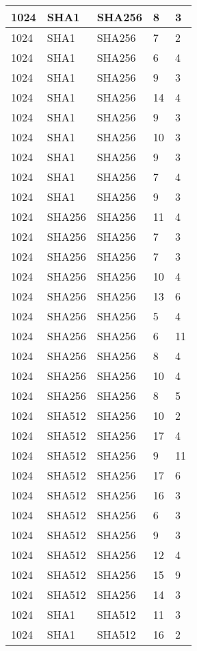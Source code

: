 \begin{tabular}{| l | l | l | l | l |}
1024 & SHA1 & SHA256 & 8 & 3 \\ \hline 
1024 & SHA1 & SHA256 & 7 & 2 \\ \hline 
1024 & SHA1 & SHA256 & 6 & 4 \\ \hline 
1024 & SHA1 & SHA256 & 9 & 3 \\ \hline 
1024 & SHA1 & SHA256 & 14 & 4 \\ \hline 
1024 & SHA1 & SHA256 & 9 & 3 \\ \hline 
1024 & SHA1 & SHA256 & 10 & 3 \\ \hline 
1024 & SHA1 & SHA256 & 9 & 3 \\ \hline 
1024 & SHA1 & SHA256 & 7 & 4 \\ \hline 
1024 & SHA1 & SHA256 & 9 & 3 \\ \hline 
1024 & SHA256 & SHA256 & 11 & 4 \\ \hline 
1024 & SHA256 & SHA256 & 7 & 3 \\ \hline 
1024 & SHA256 & SHA256 & 7 & 3 \\ \hline 
1024 & SHA256 & SHA256 & 10 & 4 \\ \hline 
1024 & SHA256 & SHA256 & 13 & 6 \\ \hline 
1024 & SHA256 & SHA256 & 5 & 4 \\ \hline 
1024 & SHA256 & SHA256 & 6 & 11 \\ \hline 
1024 & SHA256 & SHA256 & 8 & 4 \\ \hline 
1024 & SHA256 & SHA256 & 10 & 4 \\ \hline 
1024 & SHA256 & SHA256 & 8 & 5 \\ \hline 
1024 & SHA512 & SHA256 & 10 & 2 \\ \hline 
1024 & SHA512 & SHA256 & 17 & 4 \\ \hline 
1024 & SHA512 & SHA256 & 9 & 11 \\ \hline 
1024 & SHA512 & SHA256 & 17 & 6 \\ \hline 
1024 & SHA512 & SHA256 & 16 & 3 \\ \hline 
1024 & SHA512 & SHA256 & 6 & 3 \\ \hline 
1024 & SHA512 & SHA256 & 9 & 3 \\ \hline 
1024 & SHA512 & SHA256 & 12 & 4 \\ \hline 
1024 & SHA512 & SHA256 & 15 & 9 \\ \hline 
1024 & SHA512 & SHA256 & 14 & 3 \\ \hline 
1024 & SHA1 & SHA512 & 11 & 3 \\ \hline 
1024 & SHA1 & SHA512 & 16 & 2 \\ \hline 

\end{tabular}
